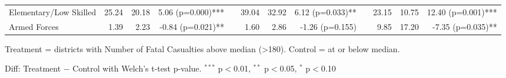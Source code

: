 \begin{table}[htbp]
\begin{tabular}{l rrr c rrr c rrr}
\quad Elementary/Low Skilled & 25.24 & 20.18 & 5.06 (p=0.000)*** &  & 39.04 & 32.92 & 6.12 (p=0.033)** &  & 23.15 & 10.75 & 12.40 (p=0.001)*** \\
\quad Armed Forces & 1.39 & 2.23 & -0.84 (p=0.021)** &  & 1.60 & 2.86 & -1.26 (p=0.155) &  & 9.85 & 17.20 & -7.35 (p=0.035)** \\
\bottomrule
\end{tabular}
\begin{tablenotes}
\small
\item Treatment = districts with Number of Fatal Casualties above median (>180). Control = at or below median.
\item Diff: Treatment $-$ Control with Welch's t-test p-value. $^{{***}}$ p$<$0.01, $^{{**}}$ p$<$0.05, $^{{*}}$ p$<$0.10
\end{tablenotes}
\end{table}

\clearpage

